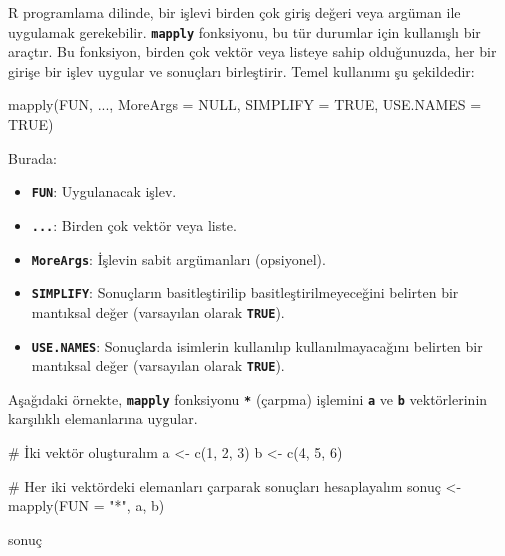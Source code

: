 \documentclass[
  letterpaper,
  DIV=11,
  numbers=noendperiod]{scrreprt}
\newenvironment{Shaded}{\begin{snugshade}}{\end{snugshade}}
\newcommand{\AttributeTok}[1]{\textcolor[rgb]{0.40,0.45,0.13}{#1}}
\newcommand{\CommentTok}[1]{\textcolor[rgb]{0.37,0.37,0.37}{#1}}
\newcommand{\ConstantTok}[1]{\textcolor[rgb]{0.56,0.35,0.01}{#1}}
\newcommand{\DecValTok}[1]{\textcolor[rgb]{0.68,0.00,0.00}{#1}}
\newcommand{\FunctionTok}[1]{\textcolor[rgb]{0.28,0.35,0.67}{#1}}
\newcommand{\NormalTok}[1]{\textcolor[rgb]{0.00,0.23,0.31}{#1}}
\newcommand{\OtherTok}[1]{\textcolor[rgb]{0.00,0.23,0.31}{#1}}
\newcommand{\StringTok}[1]{\textcolor[rgb]{0.13,0.47,0.30}{#1}}
\begin{document}
R programlama dilinde, bir işlevi birden çok giriş değeri veya argüman
ile uygulamak gerekebilir. \textbf{\texttt{mapply}} fonksiyonu, bu tür
durumlar için kullanışlı bir araçtır. Bu fonksiyon, birden çok vektör
veya listeye sahip olduğunuzda, her bir girişe bir işlev uygular ve
sonuçları birleştirir. Temel kullanımı şu şekildedir:

\begin{Shaded}
\begin{Highlighting}[]
\FunctionTok{mapply}\NormalTok{(FUN, ..., }\AttributeTok{MoreArgs =} \ConstantTok{NULL}\NormalTok{, }\AttributeTok{SIMPLIFY =} \ConstantTok{TRUE}\NormalTok{, }\AttributeTok{USE.NAMES =} \ConstantTok{TRUE}\NormalTok{)}
\end{Highlighting}
\end{Shaded}

Burada:

\begin{itemize}
\item
  \textbf{\texttt{FUN}}: Uygulanacak işlev.
\item
  \textbf{\texttt{...}}: Birden çok vektör veya liste.
\item
  \textbf{\texttt{MoreArgs}}: İşlevin sabit argümanları (opsiyonel).
\item
  \textbf{\texttt{SIMPLIFY}}: Sonuçların basitleştirilip
  basitleştirilmeyeceğini belirten bir mantıksal değer (varsayılan
  olarak \textbf{\texttt{TRUE}}).
\item
  \textbf{\texttt{USE.NAMES}}: Sonuçlarda isimlerin kullanılıp
  kullanılmayacağını belirten bir mantıksal değer (varsayılan olarak
  \textbf{\texttt{TRUE}}).
\end{itemize}

Aşağıdaki örnekte, \textbf{\texttt{mapply}} fonksiyonu
\textbf{\texttt{*}} (çarpma) işlemini \textbf{\texttt{a}} ve
\textbf{\texttt{b}} vektörlerinin karşılıklı elemanlarına uygular.

\begin{Shaded}
\begin{Highlighting}[]
\CommentTok{\# İki vektör oluşturalım}
\NormalTok{a }\OtherTok{\textless{}{-}} \FunctionTok{c}\NormalTok{(}\DecValTok{1}\NormalTok{, }\DecValTok{2}\NormalTok{, }\DecValTok{3}\NormalTok{)}
\NormalTok{b }\OtherTok{\textless{}{-}} \FunctionTok{c}\NormalTok{(}\DecValTok{4}\NormalTok{, }\DecValTok{5}\NormalTok{, }\DecValTok{6}\NormalTok{)}

\CommentTok{\# Her iki vektördeki elemanları çarparak sonuçları hesaplayalım}
\NormalTok{sonuç }\OtherTok{\textless{}{-}} \FunctionTok{mapply}\NormalTok{(}\AttributeTok{FUN =} \StringTok{"*"}\NormalTok{, a, b)}

\NormalTok{sonuç}
\end{Highlighting}
\end{Shaded}
\end{document}
